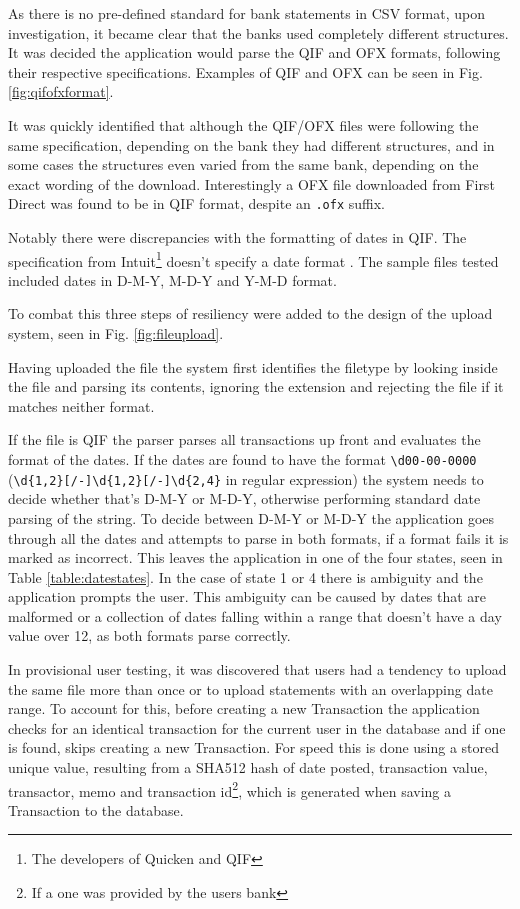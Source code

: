 As there is no pre-defined standard for bank statements in CSV format, upon investigation, it became clear that the banks used completely different structures. It was decided the application would parse the QIF and OFX formats, following their respective specifications. Examples of QIF and OFX can be seen in Fig. \ref{fig:qifofxformat}.

It was quickly identified that although the QIF/OFX files were following the same specification, depending on the bank they had different structures, and in some cases the structures even varied from the same bank, depending on the exact wording of the download. Interestingly a OFX file downloaded from First Direct was found to be in QIF format, despite an \lstinline$.ofx$ suffix.

Notably there were discrepancies with the formatting of dates in QIF. The specification from Intuit\footnote{The developers of Quicken and QIF} doesn't specify a date format \cite{quiken2010qif}. The sample files tested included dates in D-M-Y, M-D-Y and Y-M-D format.



To combat this three steps of resiliency were added to the design of the upload system, seen in Fig. \ref{fig:fileupload}.

Having uploaded the file the system first identifies the filetype by looking inside the file and parsing its contents, ignoring the extension and rejecting the file if it matches neither format.

If the file is QIF the parser parses all transactions up front and evaluates the format of the dates. If the dates are found to have the format \lstinline$\d00-00-0000$ (\lstinline$\d{1,2}[/-]\d{1,2}[/-]\d{2,4}$ in regular expression) the system needs to decide whether that's D-M-Y or M-D-Y, otherwise performing standard date parsing of the string.
%
To decide between D-M-Y or M-D-Y the application goes through all the dates and attempts to parse in both formats, if a format fails it is marked as incorrect. This leaves the application in one of the four states, seen in Table \ref{table:datestates}. In the case of state 1 or 4 there is ambiguity and the application prompts the user. This ambiguity can be caused by dates that are malformed or a collection of dates falling within a range that doesn't have a day value over 12, as both formats parse correctly. 

In provisional user testing, it was discovered that users had a tendency to upload the same file more than once or to upload statements with an overlapping date range. To account for this, before creating a new Transaction the application checks for an identical transaction for the current user in the database and if one is found, skips creating a new Transaction. For speed this is done using a stored unique value, resulting from a SHA512 hash of date posted, transaction value, transactor, memo and transaction id\footnote{If a one was provided by the users bank}, which is generated when saving a Transaction to the database.

